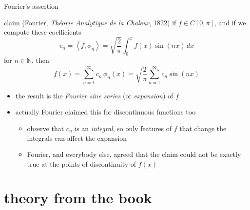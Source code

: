 \documentclass[10pt,
               svgnames,
               hyperref={colorlinks,
                         citecolor=DeepPink4,
                         linkcolor=FireBrick,
                         urlcolor=blue},
               usepdftitle=false]{beamer}
\newcommand{\NN}{\mathbb{N}}
\newcommand{\ip}[2]{\left<#1,#2\right>}
\begin{document}
\begin{frame}{Fourier's assertion}

\begin{block}{claim (Fourier, \emph{Th\'eorie Analytique de la Chaleur}, 1822)}
if $f\in C[0,\pi]$, and if we compute these coefficients
	$$c_n = \ip{f}{\phi_n} = \sqrt{\frac{2}{\pi}} \int_0^\pi f(x) \sin(nx)\,dx$$
for $n\in \NN$, then
	$$f(x) = \sum_{n=1}^\infty c_n\, \phi_n(x) = \sqrt{\frac{2}{\pi}} \sum_{n=1}^\infty c_n \sin(nx)$$
\end{block}

\begin{itemize}
\item the result is the \emph{Fourier sine series} (or \emph{expansion}) of $f$
\item actually Fourier claimed this for discontinuous functions too
   \begin{itemize}
   \item[$\circ$] observe that $c_n$ is an \emph{integral}, so only features of $f$ that change the integrals can affect the expansion
   \item[$\circ$] Fourier, and everybody else, agreed that the claim could not be exactly true at the points of discontinuity of $f(x)$
   \end{itemize}
\end{itemize}
\end{frame}


\section{theory from the book}
\end{document}
